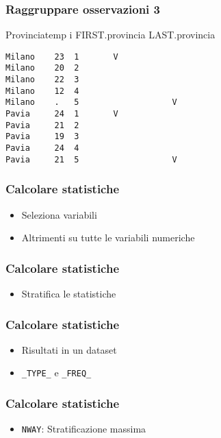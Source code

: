 \begin{frame}[containsverbatim]\frametitle{Raggruppare osservazioni 3}
  \small
  Provincia\hspace{2ex}temp\hspace{1ex} i\hspace{1ex} FIRST.provincia\hspace{1ex} LAST.provincia
\begin{verbatim}
Milano    23  1       V
Milano    20  2
Milano    22  3
Milano    12  4
Milano    .   5                   V
Pavia     24  1       V
Pavia     21  2
Pavia     19  3
Pavia     24  4
Pavia     21  5                   V
\end{verbatim}
\end{frame}


\begin{frame}[containsverbatim]\frametitle{Calcolare statistiche}
  \begin{itemize}
  \item
    Seleziona variabili
  \item
    Altrimenti su tutte le variabili numeriche
  \end{itemize}
\end{frame}



\begin{frame}[containsverbatim]\frametitle{Calcolare statistiche}
  \begin{itemize}
  \item
    Stratifica le statistiche
  \end{itemize}
\end{frame}


\begin{frame}[containsverbatim]\frametitle{Calcolare statistiche}
  \begin{itemize}
  \item
    Risultati in un dataset
  \item
    \verb+_TYPE_+ e \verb+_FREQ_+
  \end{itemize}
\end{frame}

\begin{frame}[containsverbatim]\frametitle{Calcolare statistiche}
  \begin{itemize}
  \item
    \verb+NWAY+: Stratificazione massima
  \end{itemize}
\end{frame}

